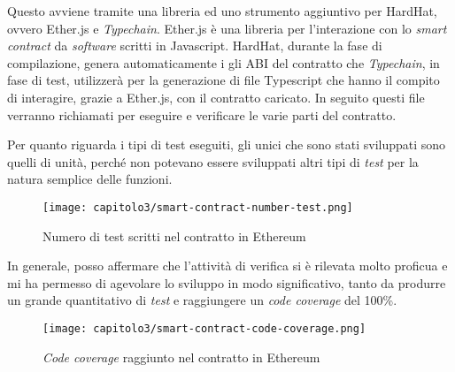 Questo avviene tramite una libreria ed uno strumento aggiuntivo per HardHat, ovvero Ether.js e \textit{Typechain}. Ether.js è una libreria per l'interazione con lo \textit{smart contract} da \textit{software} scritti in Javascript. HardHat, durante la fase di compilazione, genera automaticamente i gli ABI del contratto che \textit{Typechain}, in fase di test, utilizzerà per la generazione di file Typescript che hanno il compito di interagire, grazie a Ether.js, con il contratto caricato. In seguito questi file verranno richiamati per eseguire e verificare le varie parti del contratto.

Per quanto riguarda i tipi di test eseguiti, gli unici che sono stati sviluppati sono quelli di unità, perché non potevano essere sviluppati altri tipi di \textit{test} per la natura semplice delle funzioni.

\clearpage

\begin{figure}[h!]
  \centering
  \texttt{[image: capitolo3/smart-contract-number-test.png]}
  \caption{Numero di test scritti nel contratto in Ethereum}
\end{figure}

In generale, posso affermare che l'attività di verifica si è rilevata molto proficua e mi ha permesso di agevolare lo sviluppo in modo significativo, tanto da produrre un grande quantitativo di \textit{test} e raggiungere un \textit{code coverage} del 100\%.

\clearpage

\begin{figure}[h!]
  \centering
  \texttt{[image: capitolo3/smart-contract-code-coverage.png]}
  \caption{\textit{Code coverage} raggiunto nel contratto in Ethereum}
\end{figure}
